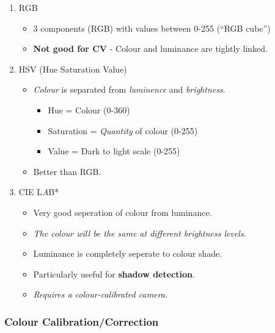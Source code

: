 \documentclass[english, 10pt]{article}
\begin{document}
\begin{enumerate}
\def\labelenumi{\arabic{enumi}.}
\itemsep1pt\parskip0pt
\item
  RGB

  \begin{itemize}
  \itemsep1pt\parskip0pt
  \item
    3 components (RGB) with values between 0-255 (``RGB cube'')
  \item
    \textbf{Not good for CV} - Colour and luminance are tightly linked.
  \end{itemize}
\item
  HSV (Hue Saturation Value)

  \begin{itemize}
  \itemsep1pt\parskip0pt
  \item
    \emph{Colour} is separated from \emph{luminence} and
    \emph{brightness}.

    \begin{itemize}
    \itemsep1pt\parskip0pt
    \item
      Hue = Colour (0-360)
    \item
      Saturation = \emph{Quantity} of colour (0-255)
    \item
      Value = Dark to light scale (0-255)
    \end{itemize}
  \item
    Better than RGB.
  \end{itemize}
\item
  CIE L\emph{A}B*

  \begin{itemize}
  \itemsep1pt\parskip0pt
  \item
    Very good seperation of colour from luminance.
  \item
    \emph{The colour will be the same at different brightness levels}.
  \item
    Luminance is completely seperate to colour shade.
  \item
    Particularly useful for \textbf{shadow detection}.
  \item
    \emph{Requires a colour-calibrated camera.}
  \end{itemize}
\end{enumerate}

\subsubsection{Colour
Calibration/Correction}\label{colour-calibrationcorrection}
\end{document}
